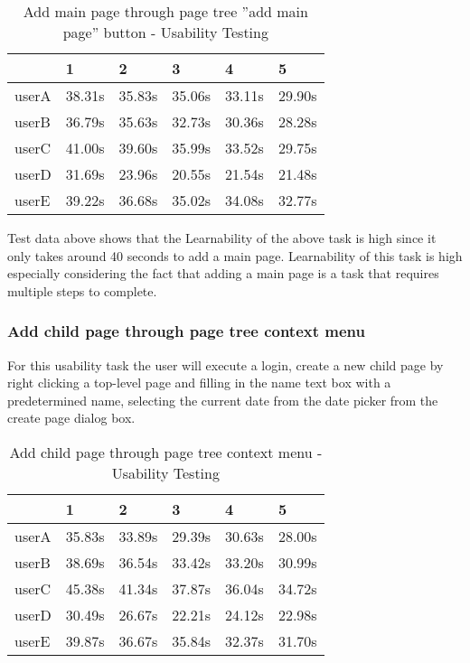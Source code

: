 \documentclass[12pt]{article}
\begin{document}
  \begin{table}[H]
\centering
\caption{Add main page through page tree ''add main page'' button - Usability Testing}
\begin{tabular}{|l|l|l|l|l|l|}
\hline
      & 1      & 2      & 3      & 4      & 5      \\ \hline
userA & 38.31s & 35.83s & 35.06s & 33.11s & 29.90s \\ \hline
userB & 36.79s & 35.63s & 32.73s & 30.36s & 28.28s \\ \hline
userC & 41.00s & 39.60s & 35.99s & 33.52s & 29.75s \\ \hline
userD & 31.69s & 23.96s & 20.55s & 21.54s & 21.48s \\ \hline
userE & 39.22s & 36.68s & 35.02s & 34.08s & 32.77s \\ \hline
\end{tabular}

\end{table}

Test data above shows that the Learnability of the above task is high since it only takes around 40 seconds to add a main page. Learnability of this task is high especially considering the fact that adding a main page is a task that requires multiple steps to complete.
  
  
\subsubsection{Add child page through page tree context menu}
For this usability task the user will execute a login, create a new child page by right clicking a top-level page and filling in the name text box with a predetermined name, selecting the current date from the date picker from the create page dialog box.

\begin{table}[H]
\centering
\caption{Add child page through page tree context menu - Usability Testing}
\begin{tabular}{|l|l|l|l|l|l|}
\hline
      & 1      & 2      & 3      & 4      & 5      \\ \hline
userA & 35.83s & 33.89s & 29.39s & 30.63s & 28.00s \\ \hline
userB & 38.69s & 36.54s & 33.42s & 33.20s & 30.99s \\ \hline
userC & 45.38s & 41.34s & 37.87s & 36.04s & 34.72s \\ \hline
userD & 30.49s & 26.67s & 22.21s & 24.12s & 22.98s \\ \hline
userE & 39.87s & 36.67s & 35.84s & 32.37s & 31.70s \\ \hline
\end{tabular}
\end{table}
\end{document}
